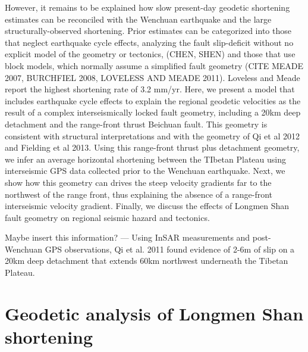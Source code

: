 \documentclass{article}
\begin{document}
However, it remains to be explained how slow present-day geodetic shortening estimates can be reconciled with the Wenchuan earthquake and the large structurally-observed shortening.
Prior estimates can be categorized into those that neglect earthquake cycle effects, analyzing the fault slip-deficit without no explicit model of the geometry or tectonics, (CHEN, SHEN) and those that use block models, which normally assume a simplified fault geometry (CITE MEADE 2007, BURCHFIEL 2008, LOVELESS AND MEADE 2011).
Loveless and Meade report the highest shortening rate of 3.2 mm/yr.
Here, we present a model that includes earthquake cycle effects to explain the regional geodetic velocities as the result of a complex interseismically locked fault geometry, including a 20km deep detachment and the range-front thrust Beichuan fault.
This geometry is consistent with structural interpretations and with the geometry of Qi et al 2012 and Fielding et al 2013. 
Using this range-front thrust plus detachment geometry, we infer an average horizontal shortening between the TIbetan Plateau using interseismic GPS data collected prior to the Wenchuan earthquake.
Next, we show how this geometry can drives the steep velocity gradients far to the northwest of the range front, thus explaining the absence of a range-front interseismic velocity gradient.
Finally, we discuss the effects of Longmen Shan fault geometry on regional seismic hazard and tectonics.

Maybe insert this information? --- Using InSAR measurements and post-Wenchuan GPS observations, Qi et al. 2011 found evidence of 2-6m of slip on a 20km deep detachment that extends 60km northwest underneath the Tibetan Plateau. 

\section{Geodetic analysis of Longmen Shan shortening}
\end{document}
